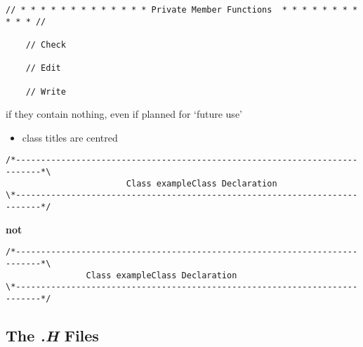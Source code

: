 \documentclass[11pt]{article}
\begin{document}
\begin{verbatim}
// * * * * * * * * * * * * * Private Member Functions  * * * * * * * * * * * //

    // Check

    // Edit

    // Write
\end{verbatim}
      if they contain nothing, even if planned for `future use'

\begin{itemize}
\item class titles are centred
\end{itemize}

\begin{verbatim}
/*---------------------------------------------------------------------------*\
                        Class exampleClass Declaration
\*---------------------------------------------------------------------------*/
\end{verbatim}

      \textbf{not}


\begin{verbatim}
/*---------------------------------------------------------------------------*\
                Class exampleClass Declaration
\*---------------------------------------------------------------------------*/
\end{verbatim}
\subsection{The \emph{.H} Files}
\label{sec-1-2}
\end{document}
